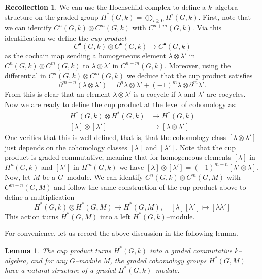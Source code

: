 \documentclass{article}
\theoremstyle{plain}
\newtheorem{Lemma}[Th]{Lemma}
\theoremstyle{definition}
\newtheorem{Rec}[Th]{Recollection}
\begin{document}
\begin{Rec}
    We can use the Hochschild complex to define a $k$--algebra structure on the graded group $H^\ast(G,k)=\bigoplus_{i\geq0}H^i(G,k)$. First, note that we can identify $C^{n}(G,k)\otimes C^m(G,k)$ with $C^{n+m}(G,k)$. Via this identification we define the \textit{cup product} 
    \[
    C^\bullet(G,k)\otimes C^\bullet(G,k)\to C^\bullet(G,k)
    \]
    as the cochain map sending a homogeneous element $\lambda \otimes \lambda'$ in $C^n(G,k)\otimes C^m(G,k)$ to $\lambda \otimes \lambda'$ in $C^{n+m}(G,k)$. Moreover, using the differential in $C^{n}(G,k)\otimes C^m(G,k)$ we deduce that the cup product satisfies 
    \[
    \partial^{m+n}(\lambda \otimes \lambda')=\partial^n\lambda\otimes \lambda' +(-1)^m \lambda \otimes \partial^m\lambda'.
    \]
    From this is clear that an element $\lambda\otimes\lambda'$ is a cocycle if $\lambda$ and $\lambda'$ are cocycles. Now we are ready to define the cup product at the level of cohomology as: 
\begin{align*}
     H^\ast(G,k)\otimes H^\ast(G,k) & \to H^\ast(G,k)\\ 
    [\lambda]\otimes[\lambda'] & \mapsto [\lambda\otimes \lambda']
\end{align*}
One verifies that this is well defined, that is, that the cohomology class $[\lambda\otimes \lambda']$ just depends on the cohomology classes $[\lambda]$ and $[\lambda']$. Note that the cup product is graded commutative, meaning that for homogeneous elements $[\lambda]$ in $H^n(G,k)$ and $[\lambda']$ in $H^m(G,k)$ we have $[\lambda]\otimes[\lambda']=(-1)^{m+n}[\lambda'\otimes\lambda]$. Now, let $M$ be a $G$--module. We can identify $C^n(G,k)\otimes C^m(G,M)$ with $C^{m+n}(G,M)$ and follow the same construction of the cup product above to define a multiplication 
\[
H^\ast(G,k)\otimes H^\ast(G,M)\to H^\ast(G,M), \quad [\lambda][\lambda']\mapsto [\lambda \lambda'] 
\]
This action turns $H^\ast(G,M)$ into a left $H^\ast(G,k)$--module.
\end{Rec}



For convenience, let us record the above discussion in the following lemma.





\begin{Lemma} 
The cup product turns  $H^\ast(G,k)$ into a graded commutative $k$--algebra, and for any $G$--module $M$,  the graded cohomology groups $H^\ast(G,M)$ have a natural structure of a graded  $H^\ast(G,k)$--module.
\end{Lemma}
\end{document}
